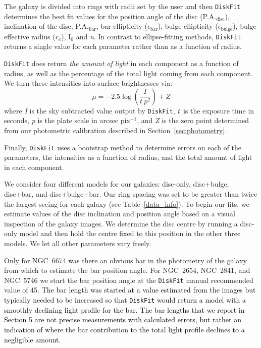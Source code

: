 \documentclass[a4paper,fleqn,usenatbib]{mnras}
\newcommand{\authorfix}{\textcolor{black}}
\begin{document}
The galaxy is divided into rings with radii set by the user and then \texttt{DiskFit} determines the best fit values for the position angle of the disc (P.A.$_{\mathrm{disc}}$), inclination of the disc, P.A.$_{\mathrm{bar}}$, bar ellipticity ($\epsilon_{\mathrm{bar}}$), bulge ellipticity ($\epsilon_{\mathrm{bulge}}$), bulge effective radius ($r_{e}$), I$_{0}$ and \textit{n}. In contrast to ellipse-fitting methods, \texttt{DiskFit} returns a single value for each parameter rather than as a function of radius.

\texttt{DiskFit} does return \textit{the amount of light} in each component as a function of radius, as well as the percentage of the total light coming from each component.   We turn these intensities into surface brightnesses via:
\begin{equation}
	\mu = -2.5 \log{ \left( \frac{I}{t\ p^{2}} \right) } + Z
\end{equation}
where \textit{I} is the sky subtracted value output by \texttt{DiskFit}, \textit{t}\ is the exposure time in seconds, \textit{p} is the plate scale in arcsec pix$^{-1}$, and \textit{Z} is the zero point determined from our photometric calibration described in Section~\ref{sec:photometry}.

Finally, \texttt{DiskFit} uses a bootstrap method to determine errors on each of the parameters, the intensities as a function of radius, and the total amount of light in each component.

We consider four different models for our galaxies: disc-only, disc+bulge, disc+bar, and disc+bulge+bar. Our ring spacing was set to be greater than twice the largest seeing for each galaxy (see Table~\ref{data_info}). To begin our fits, we estimate values of the disc inclination and position angle based on a visual inspection of the galaxy images. We determine the disc centre by running a disc-only model and then hold the centre fixed to this position in the other three models. We let all other parameters vary freely.

Only for NGC~6674 was there an obvious bar in the photometry of the galaxy from which to estimate the bar position angle. For NGC~2654, NGC~2841, and NGC~5746 we start the bar position angle at the \texttt{DiskFit} manual recommended value of 45\degr. \authorfix{The bar length was started at a value estimated from the images but typically needed to be increased so that \texttt{DiskFit} would return a model with a smoothly declining light profile for the bar. The bar lengths that we report in Section 5 are not precise measurements with calculated errors, but rather an indication of where the bar contribution to the total light profile declines to a negligible amount.}
\end{document}
